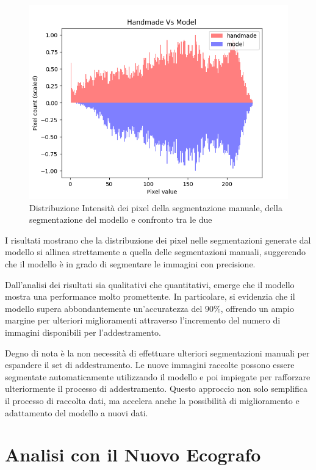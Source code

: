 \begin{figure}[!ht]
\begin{minipage}{0.32\textwidth}
		\includegraphics[width=\columnwidth]{Immagini/handmade_vs_model_scaled.png}
	\end{minipage}
	\caption{Distribuzione Intensità dei pixel della segmentazione manuale, della segmentazione del modello e confronto tra le due}
	\label{fig:distribuzione intensità dei pixel della segmentazione manuale, della segmentazione del modello e confronto tra le due}
\end{figure}


I risultati mostrano che la distribuzione dei pixel nelle segmentazioni generate dal modello si
allinea strettamente a quella delle segmentazioni manuali, suggerendo che il modello è in grado di
segmentare le immagini con precisione.


Dall'analisi dei risultati sia qualitativi che quantitativi, emerge che il modello mostra una
performance molto promettente. In particolare, si evidenzia che il modello supera abbondantemente
un'accuratezza del $90\%$, offrendo un ampio margine per ulteriori miglioramenti attraverso
l'incremento del numero di immagini disponibili per l'addestramento.

Degno di nota è la non necessità di effettuare ulteriori segmentazioni manuali per espandere il set
di addestramento. Le nuove immagini raccolte possono essere segmentate automaticamente utilizzando il
modello e poi impiegate per rafforzare ulteriormente il processo di addestramento. Questo approccio
non solo semplifica il processo di raccolta dati, ma accelera anche la possibilità di miglioramento
e adattamento del modello a nuovi dati.


\section{Analisi con il Nuovo Ecografo}
\label{sec:analisi_nuovo_ecografo}

